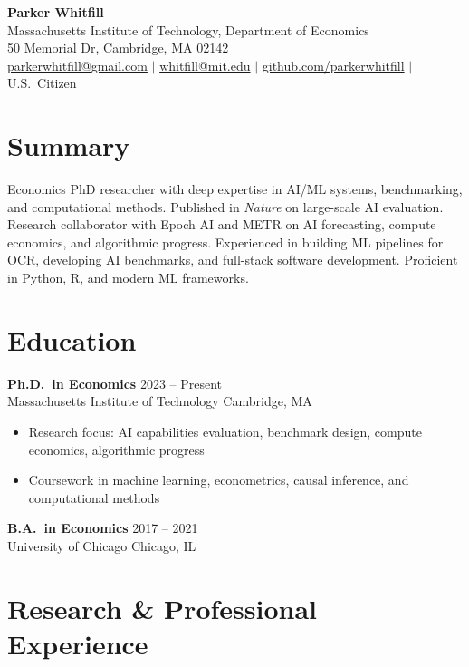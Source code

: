 \documentclass[11pt,letterpaper]{article}
\begin{document}
\begin{center}
    {\LARGE \textbf{Parker Whitfill}} \\[6pt]
    Massachusetts Institute of Technology, Department of Economics \\
    50 Memorial Dr, Cambridge, MA 02142 \\[2pt]
    \href{mailto:parkerwhitfill@gmail.com}{parkerwhitfill@gmail.com}
    \quad $\vert$ \quad
    \href{mailto:whitfill@mit.edu}{whitfill@mit.edu}
    \quad $\vert$ \quad
    \href{https://github.com/parkerwhitfill}{github.com/parkerwhitfill}
    \quad $\vert$ \quad
    U.S.\ Citizen
\end{center}

\section{Summary}
Economics PhD researcher with deep expertise in AI/ML systems, benchmarking, and computational methods.
Published in \textit{Nature} on large-scale AI evaluation.
Research collaborator with Epoch AI and METR on AI forecasting, compute economics, and algorithmic progress.
Experienced in building ML pipelines for OCR, developing AI benchmarks, and full-stack software development.
Proficient in Python, R, and modern ML frameworks.

\section{Education}

\textbf{Ph.D.\ in Economics} \hfill 2023 -- Present \\
Massachusetts Institute of Technology \hfill Cambridge, MA
\begin{itemize}
    \item Research focus: AI capabilities evaluation, benchmark design, compute economics, algorithmic progress
    \item Coursework in machine learning, econometrics, causal inference, and computational methods
\end{itemize}

\vspace{4pt}

\textbf{B.A.\ in Economics} \hfill 2017 -- 2021 \\
University of Chicago \hfill Chicago, IL

\section{Research \& Professional Experience}
\end{document}
